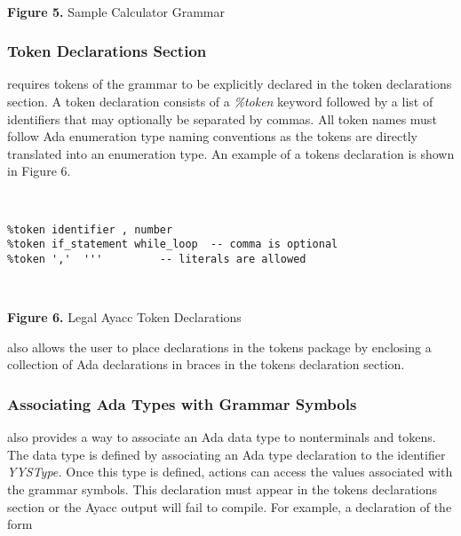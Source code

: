 \noindent\hspace{-0.05in}\hrulefill\hspace{0.0in}\\
\centerline{{\bf Figure 5.} Sample Calculator Grammar}
\subsubsection{Token Declarations Section}
\ayacc requires tokens of the grammar to be explicitly declared
in the token declarations section.  A token declaration consists of a
{\it \%token}
keyword followed  by a list of identifiers that may
optionally be separated by commas.  All token names must follow
Ada enumeration type naming conventions as the tokens are directly
translated into an enumeration type.  An example of a
tokens declaration is shown in Figure 6.

\noindent\hspace{-0.05in}\hrulefill\hspace{0.0in}\\
\vspace{-0.2in}
\begin{verbatim}
%token identifier , number
%token if_statement while_loop  -- comma is optional
%token ','  '''         -- literals are allowed
\end{verbatim}
\hspace{-0.05in}\hrulefill\hspace{0.0in}\\
\centerline{{\bf Figure 6.} Legal Ayacc Token Declarations}
\ayacc also allows the user to place declarations in the tokens package by
enclosing a collection of Ada declarations in braces
in the tokens declaration section.
\subsubsection{Associating Ada Types with Grammar Symbols}

\ayacc also provides a way to associate an Ada data type
to nonterminals and tokens.  The data type is
defined by associating an Ada type declaration to the identifier
{\it YYSType.}
Once this type is defined, actions can access the values associated with
the grammar symbols.  This declaration must appear in the tokens
declarations section or the Ayacc output will fail to compile.  For
example, a declaration of the form

